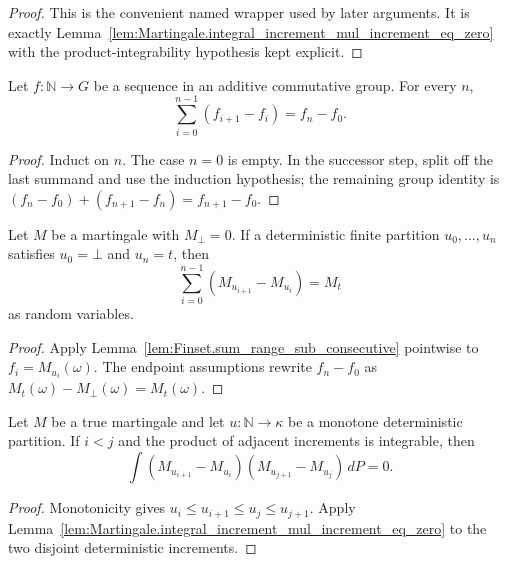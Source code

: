 \begin{proof}
This is the convenient named wrapper used by later arguments.  It is exactly
Lemma~\ref{lem:Martingale.integral_increment_mul_increment_eq_zero} with the
product-integrability hypothesis kept explicit.
\end{proof}

\begin{lemma}\label{lem:Finset.sum_range_sub_consecutive}
Let \(f:\mathbb N\to G\) be a sequence in an additive commutative group.
For every \(n\),
\[
  \sum_{i=0}^{n-1} (f_{i+1}-f_i)=f_n-f_0 .
\]
\end{lemma}

\begin{proof}
Induct on \(n\).  The case \(n=0\) is empty.  In the successor step, split
off the last summand and use the induction hypothesis; the remaining group
identity is \((f_n-f_0)+(f_{n+1}-f_n)=f_{n+1}-f_0\).
\end{proof}

\begin{lemma}\label{lem:Martingale.partition_increment_sum_eq_terminal}
Let \(M\) be a martingale with \(M_\bot=0\).  If a deterministic finite
partition \(u_0,\ldots,u_n\) satisfies \(u_0=\bot\) and \(u_n=t\), then
\[
  \sum_{i=0}^{n-1} (M_{u_{i+1}}-M_{u_i}) = M_t
\]
as random variables.
\end{lemma}

\begin{proof}
Apply Lemma~\ref{lem:Finset.sum_range_sub_consecutive} pointwise to
\(f_i=M_{u_i}(\omega)\).  The endpoint assumptions rewrite
\(f_n-f_0\) as \(M_t(\omega)-M_\bot(\omega)=M_t(\omega)\).
\end{proof}

\begin{lemma}\label{lem:Martingale.integral_partition_cross_increment_eq_zero}
Let \(M\) be a true martingale and let \(u:\mathbb N\to\kappa\) be a
monotone deterministic partition.  If \(i<j\) and the product of adjacent
increments is integrable, then
\[
  \int (M_{u_{i+1}}-M_{u_i})(M_{u_{j+1}}-M_{u_j})\,dP=0 .
\]
\end{lemma}

\begin{proof}
Monotonicity gives
\(u_i\le u_{i+1}\le u_j\le u_{j+1}\).  Apply
Lemma~\ref{lem:Martingale.integral_increment_mul_increment_eq_zero} to the
two disjoint deterministic increments.
\end{proof}

